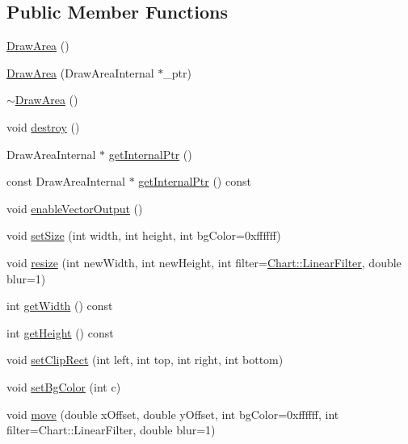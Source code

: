 \subsection*{Public Member Functions}
\begin{DoxyCompactItemize}
\item 
\hyperlink{class_draw_area_a0e69f32e6eeaf880df6e1c1bf2d2cf88}{Draw\+Area} ()
\item 
\hyperlink{class_draw_area_ae49d6328fd850bb418a474a455172e85}{Draw\+Area} (Draw\+Area\+Internal $\ast$\+\_\+ptr)
\item 
\hyperlink{class_draw_area_a30f06dd83b406afc97e8afe3cc5299af}{$\sim$\+Draw\+Area} ()
\item 
void \hyperlink{class_draw_area_a5419d2c91a119d416d79d16f7025d4e4}{destroy} ()
\item 
Draw\+Area\+Internal $\ast$ \hyperlink{class_draw_area_a975123b22c1437e30bde57e1baa69778}{get\+Internal\+Ptr} ()
\item 
const Draw\+Area\+Internal $\ast$ \hyperlink{class_draw_area_a1fd4da2ad1b70241d04328e58dd75b7e}{get\+Internal\+Ptr} () const
\item 
void \hyperlink{class_draw_area_a8e12a528febd5954e748606552946810}{enable\+Vector\+Output} ()
\item 
void \hyperlink{class_draw_area_a3ae25c8fccbbbd77bc6cf2ace5274245}{set\+Size} (int width, int height, int bg\+Color=0xffffff)
\item 
void \hyperlink{class_draw_area_ac5d26003a57fdab61b98ec6464af27e9}{resize} (int new\+Width, int new\+Height, int filter=\hyperlink{namespace_chart_ab75b9aa1781d0e0159ef1d441b577764a8cd729b7a982bac2dce8b021511e3ac6}{Chart\+::\+Linear\+Filter}, double blur=1)
\item 
int \hyperlink{class_draw_area_ac0a00686b4de7b6e196548d233dc0a36}{get\+Width} () const
\item 
int \hyperlink{class_draw_area_a1245dcb3b871d15bf9e135302d7ba98f}{get\+Height} () const
\item 
void \hyperlink{class_draw_area_a352e5b4cd7cc173079fafe4a62346961}{set\+Clip\+Rect} (int left, int top, int right, int bottom)
\item 
void \hyperlink{class_draw_area_a7371deb8b9b213bfd9e15a78991c37f0}{set\+Bg\+Color} (int c)
\item 
void \hyperlink{class_draw_area_ac6004a74de78eb60bf5ce415070cce6f}{move} (double x\+Offset, double y\+Offset, int bg\+Color=0xffffff, int filter=\+Chart\+::\+Linear\+Filter, double blur=1)
\item 

\end{DoxyCompactItemize}
